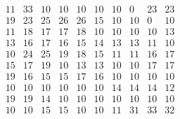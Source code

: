 \documentclass[12pt,oneside,a4paper]{article}
\begin{document}
\begin{equation}
  \tag{Mean Tabu Duration by each city table 13}
  \begin{smallmatrix} 11 & 33 & 10 & 10 & 10 & 10 & 10 & 0 & 23 & 23 \\
    19 & 23 & 25 & 26 & 26 & 15 & 10 & 10 & 0 & 10 \\
    11 & 18 & 17 & 17 & 18 & 10 & 10 & 10 & 10 & 13 \\
    13 & 16 & 17 & 16 & 15 & 14 & 13 & 13 & 11 & 10 \\
    10 & 24 & 25 & 19 & 18 & 15 & 11 & 11 & 16 & 17 \\
    15 & 17 & 19 & 10 & 13 & 13 & 10 & 10 & 17 & 17 \\
    19 & 16 & 15 & 15 & 17 & 16 & 10 & 10 & 10 & 10 \\
    10 & 10 & 10 & 10 & 10 & 10 & 14 & 14 & 14 & 12 \\
    19 & 19 & 14 & 10 & 10 & 10 & 10 & 10 & 10 & 10 \\
    10 & 10 & 15 & 15 & 10 & 10 & 11 & 31 & 33 & 32 
  \end{smallmatrix}
\end{equation}
\end{document}
